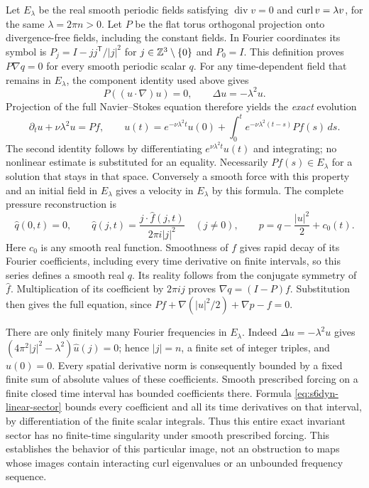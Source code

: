 Let $E_\lambda$ be the real smooth periodic fields satisfying
$\operatorname{div}v=0$ and $\operatorname{curl} v=\lambda v$, for the same
$\lambda=2\pi n>0$. Let $P$ be the flat torus orthogonal projection
onto divergence-free fields, including the constant fields. In Fourier
coordinates its symbol is $P_j=I-jj^{\mathsf T}/|j|^2$ for
$j\in\mathbb Z^3\setminus\{0\}$ and $P_0=I$. This definition proves
$P\nabla q=0$ for every smooth periodic scalar $q$.
For any time-dependent field that remains in $E_\lambda$, the component
identity used above gives
\[
 P((u\cdot\nabla)u)=0,\qquad\Delta u=-\lambda^2u.
\]
Projection of the full Navier--Stokes equation therefore yields the
\emph{exact} evolution
\begin{equation}\label{eq:s6dyn-linear-sector}
 \partial_tu+\nu\lambda^2u=Pf,\qquad
 u(t)=e^{-\nu\lambda^2t}u(0)
      +\int_0^t e^{-\nu\lambda^2(t-s)}Pf(s)\,ds.
\end{equation}
The second identity follows by differentiating
$e^{\nu\lambda^2t}u(t)$ and integrating; no nonlinear estimate is
substituted for an equality. Necessarily $Pf(s)\in E_\lambda$ for a
solution that stays in that space. Conversely a smooth force with this
property and an initial field in $E_\lambda$ gives a velocity in
$E_\lambda$ by this formula. The complete pressure reconstruction is
\[
 \widehat q(0,t)=0,\qquad
 \widehat q(j,t)=\frac{j\cdot\widehat f(j,t)}
                         {2\pi i|j|^2}\quad(j\ne0),\qquad
 p=q-\frac{|u|^2}{2}+c_0(t).
\]
Here $c_0$ is any smooth real function. Smoothness of $f$ gives rapid
decay of its Fourier coefficients, including every time derivative
on finite intervals, so this series defines a smooth real $q$.
Its reality follows from the conjugate symmetry of $\widehat f$.
Multiplication of its coefficient by $2\pi i j$ proves
$\nabla q=(I-P)f$. Substitution then gives the full equation, since
$Pf+\nabla(|u|^2/2)+\nabla p-f=0$.

There are only finitely many Fourier frequencies in $E_\lambda$.
Indeed $\Delta u=-\lambda^2u$ gives
$(4\pi^2|j|^2-\lambda^2)\widehat u(j)=0$; hence $|j|=n$, a finite
set of integer triples, and $\widehat u(0)=0$. Every spatial derivative
norm is consequently bounded by a fixed finite sum of absolute values
of these coefficients. Smooth prescribed forcing on a finite closed
time interval has bounded coefficients there. Formula
\eqref{eq:s6dyn-linear-sector} bounds every coefficient and all its
time derivatives on that interval, by differentiation of the finite
scalar integrals. Thus this entire exact invariant sector has no
finite-time singularity under smooth prescribed forcing. This establishes
the behavior of this particular image, not an obstruction to maps whose
images contain interacting curl eigenvalues or an unbounded frequency
sequence.

